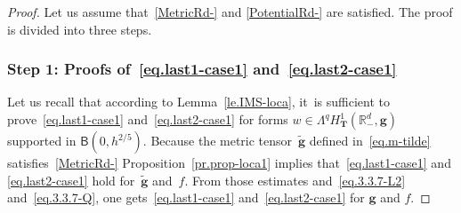 \documentclass[JEP,XML,SOM,Unicode,NoEqCountersInSection,NoFloatCountersInSection,published]{cedram}
\newcommand{\mbf}[1]{\mathbf{#1}}
\theoremstyle{plain}
\theoremstyle{definition}
\begin{document}
\begin{proof}
Let us assume that~\ref{MetricRd-} and \ref{PotentialRd-} are satisfied.
The proof is divided into three steps.

\subsubsection*{Step 1: Proofs of~\eqref{eq.last1-case1} and~\eqref{eq.last2-case1}}
Let us recall that according to Lemma~\ref{le.IMS-loca}, it~is sufficient to prove~\eqref{eq.last1-case1} and~\eqref{eq.last2-case1} for forms $w\in \Lambda^q H^1_{\mbf T}(\mathbb R^d_-, \mbf{g})$ supported in $\mathsf B(0,h^{2/5 })$.
Because the metric tensor~$\tilde{\mbf g}$ defined
in~\eqref{eq.m-tilde} satisfies~\ref{MetricRd-}
Proposition~\ref{pr.prop-loca1} implies that~\eqref{eq.last1-case1}
and \eqref{eq.last2-case1} hold
for~$\tilde{\mbf g}$ and~$f$. From those estimates
and~\eqref{eq.3.3.7-L2} and~\eqref{eq.3.3.7-Q}, one gets~\eqref{eq.last1-case1} and~\eqref{eq.last2-case1} for
${\mbf g}$ and $f$.


\end{proof}
\end{document}
